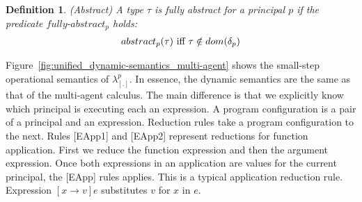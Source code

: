 \documentclass{article}
\newcommand\irname[1]{[#1]}
\newcommand\newcalculus[0]{$\lambda^p_{\left[.\right]}$}
\newtheorem{definition}{Definition}[section]
\begin{document}
	
	\begin{definition}{(Abstract)} A type $\tau$ is fully abstract for a principal $p$ if the predicate $fully\text{-}abstract_p$ holds:
	\[
	\begin{tabular}{c}	
	$abstract_p(\tau)$ iff $ \tau \notin dom(\delta_p)$
	\end{tabular}
	\]
	\end{definition}
	
	

Figure~\ref{fig:unified_dynamic-semantics_multi-agent} shows the small-step operational semantics of \newcalculus{}. In essence, the dynamic semantics are the same as that of the multi-agent calculus. The main difference is that we explicitly know which principal is executing each an expression. A program configuration is a pair of a principal and an expression. Reduction rules take a program configuration to the next. Rules \irname{EApp1} and \irname{EApp2} represent reductions for function application. First we reduce the function expression and then the argument expression. Once both expressions in an application are values for the current principal, the \irname{EApp} rules applies. This is a typical application reduction rule. Expression $\left[ x \rightarrow v \right] e$ substitutes $v$ for $x$ in $e$. 
\end{document}

